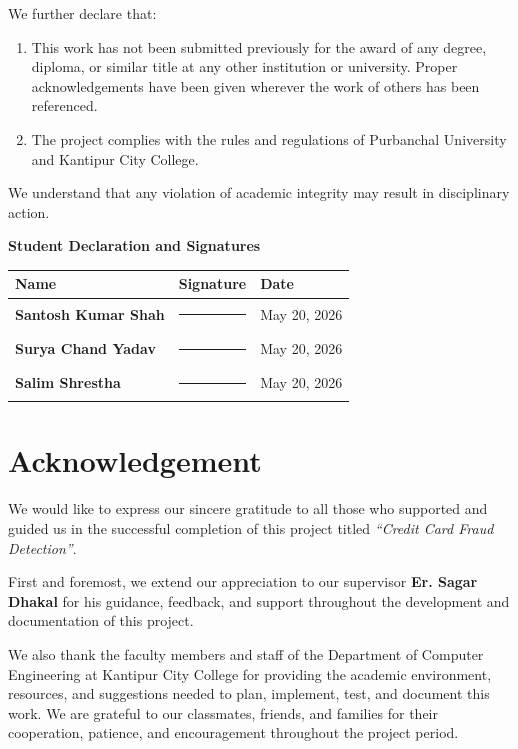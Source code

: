 \documentclass[12pt,a4paper]{report}
\newcommand{\projecttitle}{Credit Card Fraud Detection}
\newcommand{\projectdate}{May 20, 2026}
\newcommand{\supervisor}{Er. Sagar Dhakal}
\newcommand{\department}{Department of Computer Engineering}
\newcommand{\college}{Kantipur City College}
\begin{document}
We further declare that:
\begin{enumerate}
    \item This work has not been submitted previously for the award of any degree, diploma, or similar title at any other institution or university. Proper acknowledgements have been given wherever the work of others has been referenced.
    \item The project complies with the rules and regulations of Purbanchal University and \college.
\end{enumerate}

We understand that any violation of academic integrity may result in disciplinary action.

\vspace{1.2cm}
\noindent\textbf{Student Declaration and Signatures}

\vspace{0.7cm}
\renewcommand{\arraystretch}{2.2}
\begin{tabular}{>{\bfseries}p{4.6cm} p{5.3cm} p{3.4cm}}
\toprule
Name & Signature & Date \\
\midrule
Santosh Kumar Shah & \rule{4.8cm}{0.4pt} & \projectdate \\
Surya Chand Yadav & \rule{4.8cm}{0.4pt} & \projectdate \\
Salim Shrestha & \rule{4.8cm}{0.4pt} & \projectdate \\
\bottomrule
\end{tabular}
\renewcommand{\arraystretch}{1}

\newpage

\chapter*{Acknowledgement}

We would like to express our sincere gratitude to all those who supported and guided us in the successful completion of this project titled \textit{``\projecttitle''}.

First and foremost, we extend our appreciation to our supervisor \textbf{\supervisor} for his guidance, feedback, and support throughout the development and documentation of this project.

We also thank the faculty members and staff of the \department{} at \college{} for providing the academic environment, resources, and suggestions needed to plan, implement, test, and document this work. We are grateful to our classmates, friends, and families for their cooperation, patience, and encouragement throughout the project period.
\end{document}

